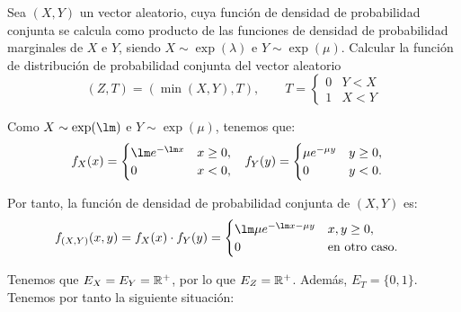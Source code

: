 \begin{ejercicio}
    Sea $(X,Y)$ un vector aleatorio, cuya función de densidad de probabilidad conjunta se calcula como producto de las funciones de densidad de probabilidad marginales de $X$ e $Y$, siendo $X\sim\exp(\lambda)$ e $Y\sim\exp(\mu)$. Calcular la función de distribución de probabilidad conjunta del vector aleatorio
    $$(Z,T)=(\min(X,Y),T),\qquad T=\begin{cases} 0 & Y<X \\ 1 & X<Y \end{cases}$$

    Como $X\sim \exp(\lm)$ e $Y\sim \exp(\mu)$, tenemos que:
    \begin{align*}
        f_X(x)&=\begin{cases}
            \lm e^{-\lm x} & x\geq 0, \\
            0 & x<0,
        \end{cases} & f_Y(y)&=\begin{cases}
            \mu e^{-\mu y} & y\geq 0, \\
            0 & y<0.
        \end{cases}
    \end{align*}

    Por tanto, la función de densidad de probabilidad conjunta de $(X,Y)$ es:
    \begin{align*}
        f_{(X,Y)}(x,y)&=f_X(x)\cdot f_Y(y)
        = \begin{cases}
            \lm\mu e^{-\lm x-\mu y} & x,y\geq 0, \\
            0 & \text{en otro caso}.
        \end{cases}
    \end{align*}

    Tenemos que $E_X=E_Y=\mathbb{R}^+$, por lo que $E_Z=\mathbb{R}^+$. Además, $E_T=\{0,1\}$.
    Tenemos por tanto la siguiente situación:
    \begin{figure}[H]
        \centering
\end{figure}
\end{ejercicio}
